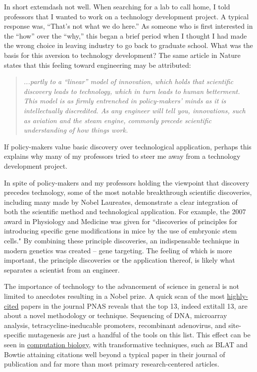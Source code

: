     In short  extemdash not well. When searching for a lab to call home, I told professors that I wanted to work on a technology development project. A typical response was, “That's not what we do here.” As someone who is first interested in the ``how'' over the ``why,'' this began a brief period when I thought I had made the wrong choice in leaving industry to go back to graduate school. What was the basis for this aversion to technology development? The same article in Nature states that this feeling toward engineering may be attributed:

    \begin{quote} 
      \itshape 
      \singlespacing
      ...partly to a ``linear'' model of innovation, which holds that scientific discovery leads to technology, which in turn leads to human betterment.  This model is as firmly entrenched in policy-makers' minds as it is intellectually discredited.  As any engineer will tell you, innovations, such as aviation and the steam engine, commonly precede scientific understanding of how things work.
      \end{quote} 

    If policy-makers value basic discovery over technological application, perhaps this explains why many of my professors tried to steer me away from a technology development project.

    In spite of policy-makers and my professors holding the viewpoint that discovery precedes technology, some of the most notable breakthrough scientific discoveries, including many made by Nobel Laureates, demonstrate a clear integration of both the scientific method and technological application.  For example, the 2007 award in Physiology and Medicine was given for “discoveries of principles for introducing specific gene modifications in mice by the use of embryonic stem cells."  By combining these principle discoveries, an indispensable technique in modern genetics was created – gene targeting.  The feeling of which is more important, the principle discoveries or the application thereof, is likely what separates a scientist from an engineer. 

    The importance of technology to the advancement of science in general is not limited to anecdotes resulting in a Nobel prize. A quick scan of the most \href{http://www.pnas.org/reports/most-cited}{highly-cited} papers in the journal PNAS reveals that the top 13, indeed   extit{all} 13, are about a novel methodology or technique. Sequencing of DNA, microarray analysis, tetracycline-ineducable promoters, recombinant adenovirus, and site-specific mutagenesis are just a handful of the tools on this list. This effect can be seen in \href{http://simplystatistics.org/2014/04/07/writing-good-software-can-have-more-impact-than-publishing-in-high-impact-journals-for-genomic-statisticians/}{computation biology}, with transformative techniques, such as BLAT \citep{Altschul1990} and Bowtie \citep{Langmead2009} attaining citations well beyond a typical paper in their journal of publication and far more than most primary research-centered articles.


